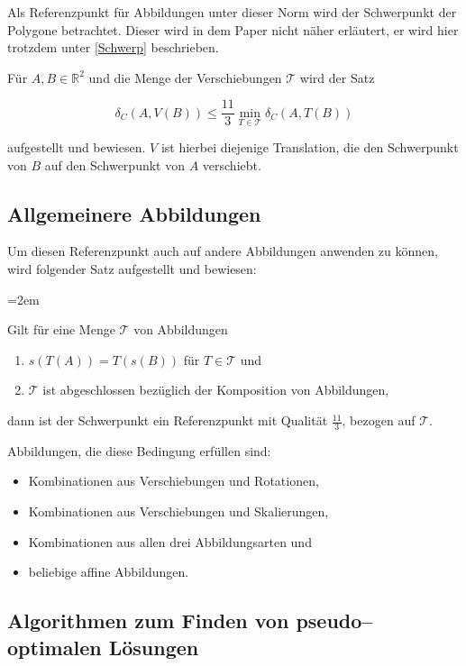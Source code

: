 Als Referenzpunkt für Abbildungen unter dieser Norm wird der Schwerpunkt der Polygone betrachtet. Dieser wird in dem Paper  nicht näher erläutert, er wird hier trotzdem unter \vref{Schwerp} beschrieben. 

Für $A, B \in \mathbb{R}^2$ und  die Menge der Verschiebungen $\mathcal{T}$ wird der Satz

$$\delta_C (A,V(B))\leq\frac{11}{3}\min_{T\in\mathcal{T}}\delta_C(A,T(B))$$


aufgestellt und bewiesen. $V$ ist hierbei diejenige Translation, die den Schwerpunkt von $B$ auf den Schwerpunkt von $A$ verschiebt.

\subsection{Allgemeinere Abbildungen}

Um diesen Referenzpunkt auch auf andere Abbildungen anwenden zu können, wird folgender Satz aufgestellt und bewiesen:

\par
\begingroup
\leftskip=2em 

Gilt für eine Menge $\mathcal{T}$  von Abbildungen 
\begin{enumerate}
\item $s(T(A))=T(s(B))$ für $T\in\mathcal{T}$ und 
\item $\mathcal{T}$ ist abgeschlossen bezüglich der Komposition von Abbildungen,
\end{enumerate}
dann ist der Schwerpunkt ein  Referenzpunkt mit Qualität $\frac{11}{3}$, bezogen auf $\mathcal{T}$.
\par
\endgroup
Abbildungen, die diese Bedingung erfüllen sind: 
\begin{itemize}
\item Kombinationen aus Verschiebungen und Rotationen,
\item Kombinationen aus Verschiebungen und Skalierungen,
\item Kombinationen aus allen drei Abbildungsarten und
\item beliebige affine Abbildungen.
\end{itemize}

\subsection{Algorithmen zum Finden von pseudo--optimalen Lösungen}

